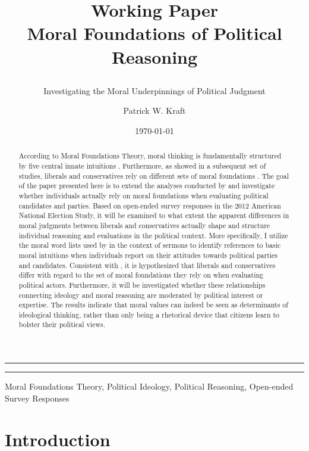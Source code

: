 \documentclass[12pt]{paper}
\author{Patrick W. Kraft}
\title{{\small Working Paper}\\
Moral Foundations of Political Reasoning\\
\subtitle{Investigating the Moral Underpinnings of Political Judgment}}
\date{\today}
\begin{document}
\maketitle

\hrule
\begin{abstract}%
According to Moral Foundations Theory, moral thinking is fundamentally structured by five central innate intuitions \citep{haidt2008moral}. Furthermore, as \citet{graham2009liberals} showed in a subsequent set of studies, liberals and conservatives rely on different sets of moral foundations \citep[see also][]{haidt2007morality}. The goal of the paper presented here is to extend the analyses conducted by \citet{graham2009liberals} and investigate whether individuals actually rely on moral foundations when evaluating political candidates and parties. Based on open-ended survey responses in the 2012 American National Election Study, it will be examined to what extent the apparent differences in moral judgments between liberals and conservatives actually shape and structure individual reasoning and evaluations in the political context. More specifically, I utilize the moral word lists used by \citet{graham2009liberals} in the context of sermons to identify references to basic moral intuitions when individuals report on their attitudes towards political parties and candidates. Consistent with \citet{graham2009liberals}, it is hypothesized that liberals and conservatives differ with regard to the set of moral foundations they rely on when evaluating political actors. Furthermore, it will be investigated whether these relationships connecting ideology and moral reasoning are moderated by political interest or expertise. The results indicate that moral values can indeed be seen as determinants of ideological thinking, rather than only being a rhetorical device that citizens learn to bolster their political views.
\end{abstract}
\hrule

\begin{keywords}
Moral Foundations Theory, Political Ideology, Political Reasoning, Open-ended Survey Responses
\end{keywords}

\newpage
\doublespacing

\section{Introduction}
\end{document}
